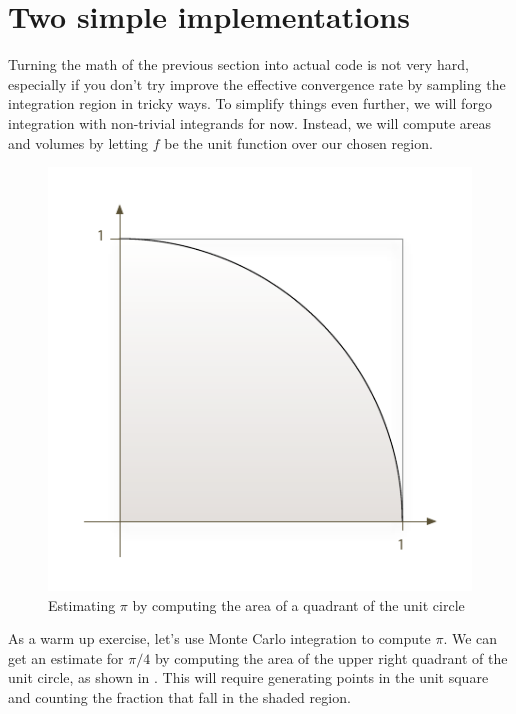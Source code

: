 %
%

\section{Two simple implementations}
\label{sec:simple}

Turning the math of the previous section into actual code is not very hard, especially if
you don't try improve the effective convergence rate by sampling the integration region in
tricky ways. To simplify things even further, we will forgo integration with non-trivial
integrands for now. Instead, we will compute areas and volumes by letting $f$ be the unit
function over our chosen region.
%
\begin{figure}
\centering
\includegraphics[scale=.75]{figures/quadrant.pdf}
\caption{Estimating $\pi$ by computing the area of a quadrant of the unit circle
  \label{fig:pie}}
\end{figure}
%

As a warm up exercise, let's use Monte Carlo integration to compute $\pi$. We can get an
estimate for $\pi/4$ by computing the area of the upper right quadrant of the unit circle,
as shown in . This will require generating points in the unit square and
counting the fraction that fall in the shaded region.

